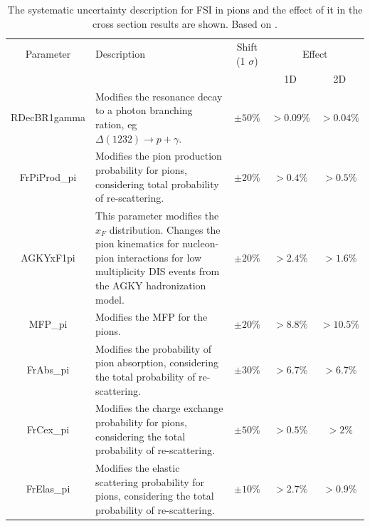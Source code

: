 \begin{table}[!htb]
    \centering
    \begin{tabular}{c|p{2in}|c|c|c}
        \hline 
        Parameter & Description  & Shift (1 $\sigma$) & \multicolumn{2}{c}{Effect} \\
         & & & 1D & 2D \\
        \hline  
        RDecBR1gamma & Modifies the resonance decay to a photon branching ration, eg $\Delta(1232)\rightarrow p + \gamma$. & $\pm50\%$ & $>0.09\%$ & $>0.04\%$\\ \hline
        FrPiProd\_pi & Modifies the pion production probability for pions, considering total probability of re-scattering. & $\pm20\%$ & $>0.4\%$ & $>0.5\%$ \\ \hline
        AGKYxF1pi & This parameter modifies the $x_F$ distribution. Changes the pion kinematics for nucleon-pion interactions for low multiplicity DIS events from the AGKY hadronization model.  & $\pm20\%$ & $>2.4\%$ & $>1.6\%$\\ \hline
        MFP\_pi & Modifies the MFP for the pions. & $\pm20\%$ & $>8.8\%$ & $>10.5\%$\\ \hline
        FrAbs\_pi & Modifies the probability of pion absorption, considering the total probability of re-scattering. & $\pm30\%$ & $>6.7\%$ & $>6.7\%$ \\ \hline 
        FrCex\_pi & Modifies the charge exchange probability for pions, considering the total probability of re-scattering. & $\pm50\%$ & $>0.5\%$ & $>2\%$\\ \hline
        FrElas\_pi & Modifies the elastic scattering probability for pions, considering the total probability of re-scattering. & $\pm10\%$ & $>2.7\%$ & $>0.9\%$ \\ \hline
        

        
    \end{tabular}
    \caption{The systematic uncertainty description for FSI in pions and the effect of it in the cross section results are shown. Based on \cite{GENIEUnc}.}
    \label{tab:ErrorAnalysis:SystematicUnc:FSIPi}
\end{table}

